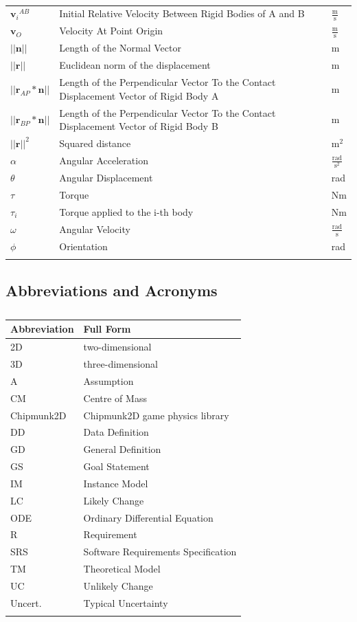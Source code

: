 \documentclass[12pt]{article}
\begin{document}
\begin{longtabu}{l X[l] l}
\\
${{\mathbf{v}_{i}}^{AB}}$ & Initial Relative Velocity Between Rigid Bodies of A and B & $\frac{\text{m}}{\text{s}}$
\\
${\mathbf{v}_{O}}$ & Velocity At Point Origin & $\frac{\text{m}}{\text{s}}$
\\
$||\mathbf{n}||$ & Length of the Normal Vector & m
\\
$||\mathbf{r}||$ & Euclidean norm of the displacement & m
\\
$||{\mathbf{r}_{AP}}*\mathbf{n}||$ & Length of the Perpendicular Vector To the Contact Displacement Vector of Rigid Body A & m
\\
$||{\mathbf{r}_{BP}}*\mathbf{n}||$ & Length of the Perpendicular Vector To the Contact Displacement Vector of Rigid Body B & m
\\
${||\mathbf{r}||^{2}}$ & Squared distance & $\text{m}^{2}$
\\
$α$ & Angular Acceleration & $\frac{\text{rad}}{\text{s}^{2}}$
\\
$θ$ & Angular Displacement & rad
\\
$τ$ & Torque & Nm
\\
${τ_{i}}$ & Torque applied to the i-th body & Nm
\\
$ω$ & Angular Velocity & $\frac{\text{rad}}{\text{s}}$
\\
$ϕ$ & Orientation & rad
\\
\bottomrule
\caption{}
\label{Table:ToS}
\end{longtabu}
\subsection{Abbreviations and Acronyms}
\label{Sec:TAbbAcc}
\begin{longtable}{l l}
\toprule
Abbreviation & Full Form
\\
\midrule
\endhead
2D & two-dimensional
\\
3D & three-dimensional
\\
A & Assumption
\\
CM & Centre of Mass
\\
Chipmunk2D & Chipmunk2D game physics library
\\
DD & Data Definition
\\
GD & General Definition
\\
GS & Goal Statement
\\
IM & Instance Model
\\
LC & Likely Change
\\
ODE & Ordinary Differential Equation
\\
R & Requirement
\\
SRS & Software Requirements Specification
\\
TM & Theoretical Model
\\
UC & Unlikely Change
\\
Uncert. & Typical Uncertainty
\\
\bottomrule
\caption{}
\label{Table:TAbbAcc}
\end{longtable}
\end{document}

